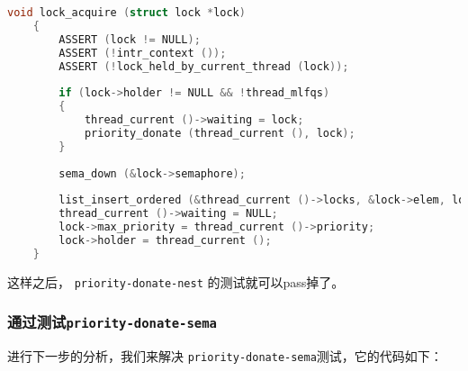 \documentclass{article}
\begin{document}
	\begin{lstlisting}[language=C, title=修改后的\texttt{lock\_acquire()}函数]
    void lock_acquire (struct lock *lock)
    {
    	ASSERT (lock != NULL);
    	ASSERT (!intr_context ());
    	ASSERT (!lock_held_by_current_thread (lock));
    	
    	if (lock->holder != NULL && !thread_mlfqs)
    	{
    		thread_current ()->waiting = lock;
    		priority_donate (thread_current (), lock);
    	}
    	
    	sema_down (&lock->semaphore);
    	
    	list_insert_ordered (&thread_current ()->locks, &lock->elem, lock_priority_cmp, NULL);
    	thread_current ()->waiting = NULL;
    	lock->max_priority = thread_current ()->priority;
    	lock->holder = thread_current ();
    }
	\end{lstlisting}
	
	这样之后， \texttt{priority-donate-nest} 的测试就可以pass掉了。
	
	\subsubsection{通过测试\texttt{priority-donate-sema}}
	
	进行下一步的分析，我们来解决 \texttt{priority-donate-sema}测试，它的代码如下：
	
\end{document}
